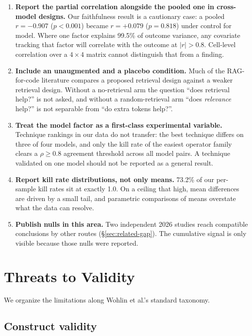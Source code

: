\documentclass[smallextended]{svjour3}
\begin{document}
\begin{enumerate}
\item \textbf{Report the partial correlation alongside the pooled one
 in cross-model designs.} Our faithfulness result is a cautionary
 case: a pooled $r = -0.907$ ($p < 0.001$) became $r = +0.079$
 ($p = 0.818$) under control for model. Where one factor explains
 99.5\% of outcome variance, any covariate tracking that factor will
 correlate with the outcome at $|r| > 0.8$. Cell-level correlation
 over a $4 \times 4$ matrix cannot distinguish that from a finding.
\item \textbf{Include an unaugmented and a placebo condition.} Much
 of the RAG-for-code literature compares a proposed retrieval design
 against a weaker retrieval design. Without a no-retrieval arm the
 question ``does retrieval help?'' is not asked, and without a
 random-retrieval arm ``does \emph{relevance} help?'' is not
 separable from ``do extra tokens help?''.
\item \textbf{Treat the model factor as a first-class experimental
 variable.} Technique rankings in our data do not transfer: the best
 technique differs on three of four models, and only the kill rate of
 the easiest operator family clears a $\rho \geq 0.8$ agreement
 threshold across all model pairs. A technique validated on one
 model should not be reported as a general result.
\item \textbf{Report kill rate distributions, not only means.}
 73.2\% of our per-sample kill rates sit at exactly 1.0. On a
 ceiling that high, mean differences are driven by a small tail, and
 parametric comparisons of means overstate what the data can
 resolve.
\item \textbf{Publish nulls in this area.} Two independent 2026
 studies reach compatible conclusions by other routes
 (\S\ref{sec:related-gap}). The cumulative signal is only visible
 because those nulls were reported.
\end{enumerate}

\section{Threats to Validity}\label{sec:limitations}

We organize the limitations along Wohlin et al.'s
\citep{wohlin2012} standard taxonomy.

\subsection{Construct validity}\label{sec:limitations-construct}
\end{document}
